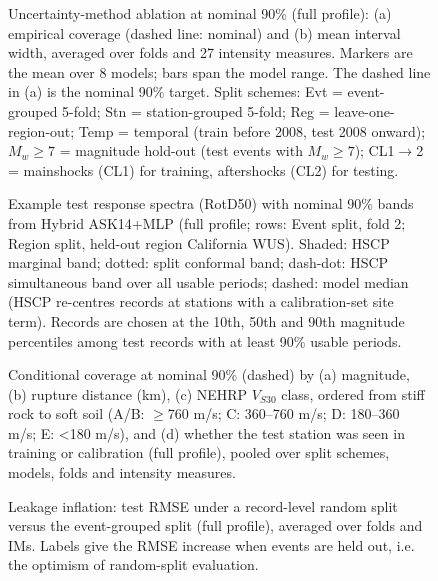 \begin{figure}[htbp]
\centering
{}
\caption{Uncertainty-method ablation at nominal 90\% (full profile): (a) empirical coverage (dashed line: nominal) and (b) mean interval width, averaged over folds and 27 intensity measures. Markers are the mean over 8 models; bars span the model range. The dashed line in (a) is the nominal 90\% target. Split schemes: Evt = event-grouped 5-fold; Stn = station-grouped 5-fold; Reg = leave-one-region-out; Temp = temporal (train before 2008, test 2008 onward); $M_w{\geq}7$ = magnitude hold-out (test events with $M_w \geq 7$); CL1$\rightarrow$2 = mainshocks (CL1) for training, aftershocks (CL2) for testing.}
\label{fig:fig4_conformal_ablation}
\end{figure}

\begin{figure}[htbp]
\centering
{}
\caption{Example test response spectra (RotD50) with nominal 90\% bands from Hybrid ASK14+MLP (full profile; rows: Event split, fold 2; Region split, held-out region California WUS). Shaded: HSCP marginal band; dotted: split conformal band; dash-dot: HSCP simultaneous band over all usable periods; dashed: model median (HSCP re-centres records at stations with a calibration-set site term). Records are chosen at the 10th, 50th and 90th magnitude percentiles among test records with at least 90\% usable periods.}
\label{fig:fig5_spectral_bands}
\end{figure}

\begin{figure}[htbp]
\centering
{}
\caption{Conditional coverage at nominal 90\% (dashed) by (a) magnitude, (b) rupture distance (km), (c) NEHRP $V_{S30}$ class, ordered from stiff rock to soft soil (A/B: $\geq$760 m/s; C: 360–760 m/s; D: 180–360 m/s; E: <180 m/s), and (d) whether the test station was seen in training or calibration (full profile), pooled over split schemes, models, folds and intensity measures.}
\label{fig:fig6_conditional_coverage}
\end{figure}

\begin{figure}[htbp]
\centering
{}
\caption{Leakage inflation: test RMSE under a record-level random split versus the event-grouped split (full profile), averaged over folds and IMs. Labels give the RMSE increase when events are held out, i.e. the optimism of random-split evaluation.}
\label{fig:figS1_random_leakage_inflation}
\end{figure}


